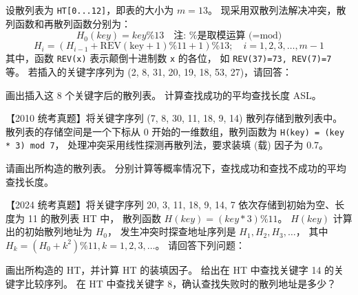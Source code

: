\begin{qitems}
\begin{bbox}
    \end{bbox}
    \begin{bbox}
        \qitem 设散列表为 \lstinline{HT[0...12]}，即表的大小为 $m=13$。
        现采用双散列法解决冲突，散列函数和再散列函数分别为：
        \[ H_0(key) = key \% 13 \quad \text{注: \% 是取模运算 (=mod)} \]
        \[ H_i = (H_{i-1} + \text{REV}(\text{key}+1) \% 11 + 1) \% 13; \quad i = 1, 2, 3, \dots, m-1 \]
        其中，函数 \lstinline{REV(x)} 表示颠倒十进制数 \lstinline{x} 的各位，
        如 \lstinline{REV(37)=73, REV(7)=7} 等。
        若插入的关键字序列为 (2, 8, 31, 20, 19, 18, 53, 27)，请回答：
        \begin{subqitems}
            \subqitem 画出插入这 8 个关键字后的散列表。
            \subqitem 计算查找成功的平均查找长度 ASL。
        \end{subqitems}
    \end{bbox}
    \begin{bbox}
        \qitem 【2010 统考真题】将关键字序列 (7, 8, 30, 11, 18, 9, 14) 散列存储到散列表中。
        散列表的存储空间是一个下标从 0 开始的一维数组，散列函数为 \lstinline{H(key) = (key * 3) mod 7}，
        处理冲突采用线性探测再散列法，要求装填 (载) 因子为 0.7。
        \begin{subqitems}
            \subqitem 请画出所构造的散列表。
            \subqitem 分别计算等概率情况下，查找成功和查找不成功的平均查找长度。
        \end{subqitems}
    \end{bbox}
    \begin{bbox}
        \qitem 【2024 统考真题】将关键字序列 20, 3, 11, 18, 9, 14, 7 依次存储到初始为空、长度为 11 的散列表 HT 中，
        散列函数 $H(key) = (key * 3) \% 11$。
        $H(key)$ 计算出的初始散列地址为 $H_0$，
        发生冲突时探查地址序列是 $H_1, H_2, H_3, \dots$，
        其中 $H_k = (H_0 + k^2) \% 11, k=1, 2, 3, \dots$。
        请回答下列问题：
        \begin{subqitems}
            \subqitem 画出所构造的 HT，并计算 HT 的装填因子。
            \subqitem 给出在 HT 中查找关键字 14 的关键字比较序列。
            \subqitem 在 HT 中查找关键字 8，确认查找失败时的散列地址是多少？
        \end{subqitems}
    \end{bbox}
\end{qitems} 